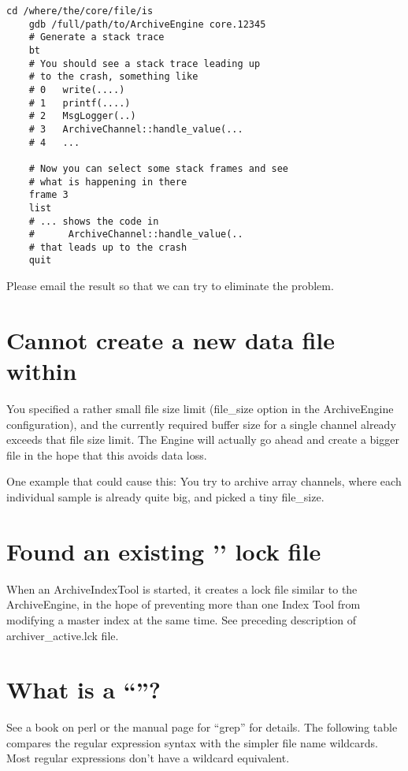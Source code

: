 \begin{lstlisting}[keywordstyle=\sffamily]
    cd /where/the/core/file/is
    gdb /full/path/to/ArchiveEngine core.12345
    # Generate a stack trace
    bt
    # You should see a stack trace leading up
    # to the crash, something like
    # 0   write(....)
    # 1   printf(....)
    # 2   MsgLogger(..)
    # 3   ArchiveChannel::handle_value(...
    # 4   ...

    # Now you can select some stack frames and see
    # what is happening in there
    frame 3
    list
    # ... shows the code in
    #      ArchiveChannel::handle_value(..
    # that leads up to the crash
    quit
\end{lstlisting}

\noindent Please email the result so that we can try to eliminate the
problem.

\section{Cannot create a new data file within }
You specified a rather small file size limit (file\_size option in the
ArchiveEngine configuration), and the currently required buffer size
for a single channel already exceeds that file size limit.
The Engine will actually go ahead and create a bigger file in the hope
that this avoids data loss.

One example that could cause this: You try to archive array channels,
where each individual sample is already quite big, and picked a tiny
file\_size. 

\section{Found an existing '' lock file}
When an ArchiveIndexTool is started, it creates a lock file
similar to the ArchiveEngine, in the hope of preventing more than
one Index Tool from modifying a master index at the same time.
See preceding description of archiver\_active.lck file.

\section{What is a ``''?}
See a book on perl or the manual page for ``grep'' for details.
The following table compares the regular expression syntax with the simpler
file name wildcards. Most regular expressions don't have a wildcard equivalent.

